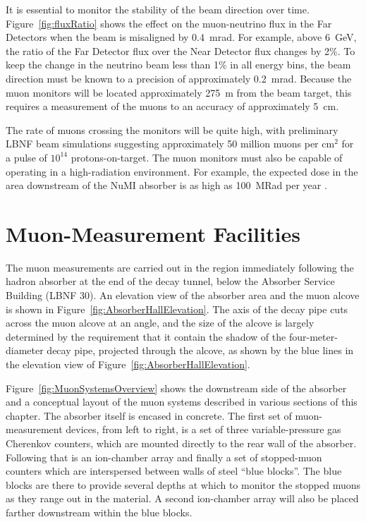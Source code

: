 It is essential to monitor the stability of the beam direction over
time. Figure~\ref{fig:fluxRatio} shows the effect on the muon-neutrino
flux in the Far Detectors when the beam is misaligned by 0.4~mrad.  
For example, above 6~GeV, the ratio of the Far Detector flux over 
the Near Detector flux changes by 2\%.  
To keep the change in the neutrino beam less than 1\% in all energy bins,
the beam direction must be known to a precision of approximately 0.2~mrad. 
Because the muon monitors will be located approximately 275~m
from the beam target, this requires a measurement of the muons to an
accuracy of approximately 5~cm.


The rate of muons crossing the monitors will be quite high, with
preliminary LBNF beam simulations suggesting approximately 50 million
muons per cm$^{2}$ for a pulse of $10^{14}$ protons-on-target. The
muon monitors must also be capable of operating in a high-radiation
environment.  For example, the expected dose in the area downstream of
the NuMI absorber is as high as 100~MRad per year \cite{ref:NuMIBeamMonitors}.

%
%
\section{Muon-Measurement Facilities}

The muon measurements are carried out in the region immediately
following the hadron absorber at the end of the decay tunnel, below
the Absorber Service Building (LBNF 30).  An elevation view
of the absorber area and the muon alcove is shown in Figure~\ref{fig:AbsorberHallElevation}. 
The axis of the decay pipe cuts across the muon alcove at an angle, and the size of the alcove
is largely determined by the requirement that it contain the
shadow of the four-meter-diameter decay pipe, projected through the
alcove, as shown by the blue lines in the elevation view of Figure~\ref{fig:AbsorberHallElevation}. 

Figure~\ref{fig:MuonSystemsOverview} shows the downstream side of the
absorber and a conceptual layout of the muon systems described in various sections of this
chapter.  
The absorber itself is encased in concrete. The first set of
muon-measurement devices, from left to right, is a
set of three variable-pressure gas Cherenkov counters, which are
mounted directly to the rear wall of the absorber. Following that is an ion-chamber array and finally a set of stopped-muon counters which are interspersed between walls of
steel ``blue blocks''.   The blue blocks are there to provide several
depths at which to monitor the stopped muons as they range out in the
material. A second ion-chamber array will also be placed farther downstream within the blue blocks.


